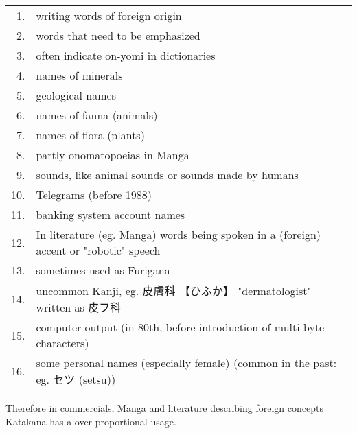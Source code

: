 \bigskip

\begin{tabular}{rp{15cm}}
1.& writing words of foreign origin\\
2.& words that need to be emphasized\\
3. &often indicate on-yomi in dictionaries\\
4.& names of minerals \\
5.& geological names \\
6.& names of fauna (animals)\\
7.& names of flora (plants)\\
8.& partly onomatopoeias in Manga\\
9.& sounds, like animal sounds or sounds made by humans\\
10.& Telegrams (before 1988)\\
11.& banking system account names\\
12.& In literature (eg. Manga) words being spoken in a (foreign) accent or "robotic" speech\\
13. &sometimes used as Furigana\\
14. & uncommon Kanji, eg.  {皮膚科} {【ひふか】} "dermatologist" written as {皮フ科}\\
15.& computer output (in 80th, before introduction of multi byte characters)\\
16. &some personal names (especially female) (common in the past: eg. セツ (setsu))\\

\end{tabular}

\medskip

Therefore in commercials, Manga and literature describing foreign concepts
Katakana has a over proportional usage.



%


